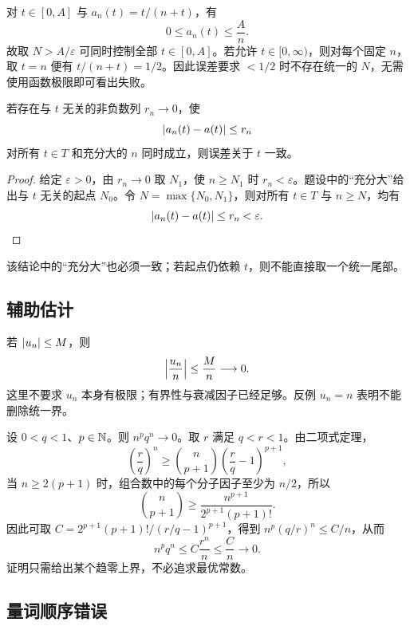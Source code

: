 \begin{example}
对 \(t\in[0,A]\) 与 \(a_n(t)=t/(n+t)\)，有
\[
 0\le a_n(t)\le\frac A n.
\]
故取 \(N>A/\varepsilon\) 可同时控制全部 \(t\in[0,A]\)。若允许 \(t\in[0,\infty)\)，则对每个固定 \(n\)，取 \(t=n\) 便有 \(t/(n+t)=1/2\)。因此误差要求 \(<1/2\) 时不存在统一的 \(N\)，无需使用函数极限即可看出失败。
\end{example}

\begin{proposition}
若存在与 \(t\) 无关的非负数列 \(r_n\to0\)，使
\[
 \left|a_n(t)-a(t)\right|\le r_n
\]
对所有 \(t\in T\) 和充分大的 \(n\) 同时成立，则误差关于 \(t\) 一致。
\end{proposition}

\begin{proof}
给定 \(\varepsilon>0\)，由 \(r_n\to0\) 取 \(N_1\)，使 \(n\ge N_1\) 时 \(r_n<\varepsilon\)。题设中的“充分大”给出与 \(t\) 无关的起点 \(N_0\)。令 \(N=\max\{N_0,N_1\}\)，则对所有 \(t\in T\) 与 \(n\ge N\)，均有
\[
 \left|a_n(t)-a(t)\right|\le r_n<\varepsilon.
\]
\end{proof}

该结论中的“充分大”也必须一致；若起点仍依赖 \(t\)，则不能直接取一个统一尾部。

\subsection{辅助估计}

\begin{example}
若 \(\left|u_n\right|\le M\)，则
\[
 \left|\frac{u_n}{n}\right|\le\frac Mn\longrightarrow0.
\]
这里不要求 \(u_n\) 本身有极限；有界性与衰减因子已经足够。反例 \(u_n=n\) 表明不能删除统一界。
\end{example}

\begin{example}[几何衰减快于多项式增长]
设 \(0<q<1\)、\(p\in\mathbb{N}\)。则 \(n^p q^n\to0\)。取 \(r\) 满足 \(q<r<1\)。由二项式定理，
\[
 \left(\frac rq\right)^n
 \ge \binom n{p+1}\left(\frac rq-1\right)^{p+1},
\]
当 \(n\ge2(p+1)\) 时，组合数中的每个分子因子至少为 \(n/2\)，所以
\[
 \binom n{p+1}\ge\frac{n^{p+1}}{2^{p+1}(p+1)!}.
\]
因此可取 \(C=2^{p+1}(p+1)!/(r/q-1)^{p+1}\)，得到 \(n^p(q/r)^n\le C/n\)，从而
\[
 n^pq^n\le C\frac{r^n}{n}\le\frac Cn\to0.
\]
证明只需给出某个趋零上界，不必追求最优常数。
\end{example}

\subsection{量词顺序错误}

